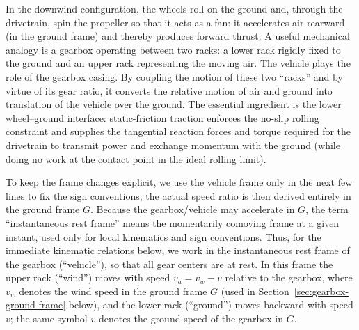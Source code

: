\documentclass[reprint,aps,pra,longbibliography]{revtex4-2}
\begin{document}
In the downwind configuration, the wheels roll on the ground and, through the drivetrain, spin the propeller so that it acts as a fan: it accelerates air rearward (in the ground frame) and thereby produces forward thrust. A useful mechanical analogy is a gearbox operating between two racks: a lower rack rigidly fixed to the ground and an upper rack representing the moving air. The vehicle plays the role of the gearbox casing. By coupling the motion of these two ``racks'' and by virtue of its gear ratio, it converts the relative motion of air and ground into translation of the vehicle over the ground. The essential ingredient is the lower wheel--ground interface: static-friction traction enforces the no-slip rolling constraint and supplies the tangential reaction forces and torque required for the drivetrain to transmit power and exchange momentum with the ground (while doing no work at the contact point in the ideal rolling limit).

To keep the frame changes explicit, we use the vehicle frame only in the next
few lines to fix the sign conventions; the actual speed ratio is then derived
entirely in the ground frame \(G\). Because the gearbox/vehicle may accelerate
in \(G\), the term ``instantaneous rest frame'' means the momentarily comoving
frame at a given instant, used only for local kinematics and sign conventions.
Thus, for the immediate kinematic relations below, we work in the instantaneous
rest frame of the gearbox (``vehicle''), so that all gear centers are at rest.
In this frame the upper rack (``wind'') moves with speed $v_a=v_w-v$ relative to the
gearbox, where $v_w$ denotes the wind speed in the ground frame  \(G\) (used in Section~\ref{sec:gearbox-ground-frame} below),
and the lower rack (``ground'') moves backward with speed $v$; the
same symbol $v$ denotes the ground speed of the gearbox in \(G\).
\end{document}
